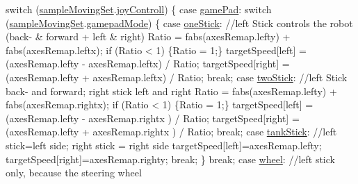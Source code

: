 \begin{DoxyCode}
{        \textcolor{keywordflow}{switch} (\hyperlink{classSampleMoving_af9c7dc0be1c4197469fbfa7aa105f1cc}{sampleMovingSet}.\hyperlink{structSampleMoving_1_1sampleMovingSettingStruct_abcbeb9363905012770950c4908a4e1aa}{joyControll}) \{
            \textcolor{keywordflow}{case} \hyperlink{classSampleMoving_ad495d48e1ec2093a36601548bfad852dafd942ead788c486efb6c26363e68acff}{gamePad}:
                \textcolor{keywordflow}{switch} (\hyperlink{classSampleMoving_af9c7dc0be1c4197469fbfa7aa105f1cc}{sampleMovingSet}.\hyperlink{structSampleMoving_1_1sampleMovingSettingStruct_a1b3cbdffd2c270871b009022b1f65eb0}{gamepadMode}) 
      \{
                    \textcolor{keywordflow}{case} \hyperlink{classSampleMoving_ad45933bb8e660772ea25747d3446bd8aaf949a715587ed74b5cb1f8199e3f369d}{oneStick}: \textcolor{comment}{//left Stick controls the robot
       (back- & forward + left & right)}
                        Ratio = fabs(axesRemap.lefty) + fabs(axesRemap.leftx);
                        \textcolor{keywordflow}{if} (Ratio < 1) \{Ratio = 1;\}
                        targetSpeed[left] = (axesRemap.lefty - axesRemap.leftx)
       / Ratio;
                        targetSpeed[right] =(axesRemap.lefty + axesRemap.leftx)
       / Ratio;
                        \textcolor{keywordflow}{break};
                    \textcolor{keywordflow}{case} \hyperlink{classSampleMoving_ad45933bb8e660772ea25747d3446bd8aa34ec1e09ac95890b7840157db35fe828}{twoStick}:  \textcolor{comment}{//left Stick back- and forward;
       right stick left and right}
                        Ratio = fabs(axesRemap.lefty) + fabs(axesRemap.rightx);
                        \textcolor{keywordflow}{if} (Ratio < 1) \{Ratio = 1;\}
                        targetSpeed[left] = (axesRemap.lefty - axesRemap.rightx
      ) / Ratio;
                        targetSpeed[right] =(axesRemap.lefty + axesRemap.rightx
      ) / Ratio;
                        \textcolor{keywordflow}{break};
                    \textcolor{keywordflow}{case} \hyperlink{classSampleMoving_ad45933bb8e660772ea25747d3446bd8aaa424c4ac1573cab2407925cf755474ba}{tankStick}:    \textcolor{comment}{//left stick=left side; right
       stick = right side}
                        targetSpeed[left]=axesRemap.lefty;
                        targetSpeed[right]=axesRemap.righty;
                        \textcolor{keywordflow}{break};
                \}
                \textcolor{keywordflow}{break};
            \textcolor{keywordflow}{case} \hyperlink{classSampleMoving_ad495d48e1ec2093a36601548bfad852da003251f50ad3e22d0ab96167b517d017}{wheel}:    \textcolor{comment}{//left stick only, because the steering wheel
}}
\end{DoxyCode}

